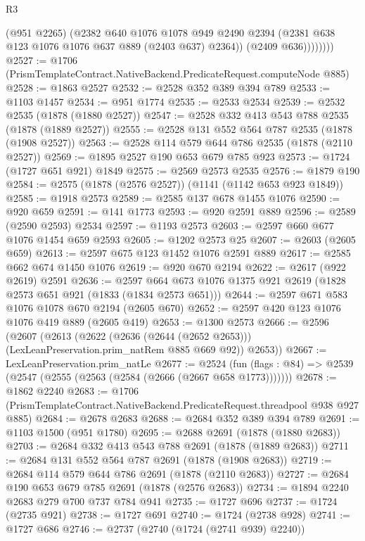 \begin{lexlean}{R3}
\begin{coremodule}
                  (@951 @2265)
                  (@2382
                    @640
                    @1076
                    @1078
                    @949
                    @2490
                    @2394
                    (@2381 @638 @123 @1076 @1076 @637 @889 (@2403 @637) @2364))
                  (@2409 @636))))))))
@2527 := @1706 (PrismTemplateContract.NativeBackend.PredicateRequest.computeNode @885)
@2528 := @1863 @2527
@2532 := @2528 @352 @389 @394 @789
@2533 := @1103 @1457
@2534 := @951 @1774
@2535 := @2533 @2534
@2539 := @2532 @2535 (@1878 (@1880 @2527))
@2547 := @2528 @332 @413 @543 @788 @2535 (@1878 (@1889 @2527))
@2555 := @2528 @131 @552 @564 @787 @2535 (@1878 (@1908 @2527))
@2563 := @2528 @114 @579 @644 @786 @2535 (@1878 (@2110 @2527))
@2569 := @1895 @2527 @190 @653 @679 @785 @923
@2573 := @1724 (@1727 @651 @921) @1849
@2575 := @2569 @2573 @2535
@2576 := @1879 @190
@2584 := @2575 (@1878 (@2576 @2527)) (@1141 (@1142 @653 @923 @1849))
@2585 := @1918 @2573
@2589 := @2585 @137 @678 @1455 @1076
@2590 := @920 @659
@2591 := @141 @1773
@2593 := @920 @2591 @889
@2596 := @2589 (@2590 @2593) @2534
@2597 := @1193 @2573
@2603 := @2597 @660 @677 @1076 @1454 @659 @2593
@2605 := @1202 @2573 @25
@2607 := @2603 (@2605 @659)
@2613 := @2597 @675 @123 @1452 @1076 @2591 @889
@2617 := @2585 @662 @674 @1450 @1076
@2619 := @920 @670 @2194
@2622 := @2617 (@922 @2619) @2591
@2636 := @2597 @664 @673 @1076 @1375 @921 @2619 (@1828 @2573 @651 @921 (@1833 (@1834 @2573 @651)))
@2644 := @2597 @671 @583 @1076 @1078 @670 @2194 (@2605 @670)
@2652 := @2597 @420 @123 @1076 @1076 @419 @889 (@2605 @419)
@2653 := @1300 @2573
@2666 := @2596
    (@2607
      (@2613
        (@2622 (@2636 (@2644 (@2652 @2653))) (LexLeanPreservation.prim_natRem @885 @669 @92))
        @2653))
@2667 := LexLeanPreservation.prim_natLe
@2677 := @2524
    (fun (flags : @84) => @2539 (@2547 (@2555 (@2563 (@2584 (@2666 (@2667 @658 @1773)))))))
@2678 := @1862 @2240
@2683 := @1706 (PrismTemplateContract.NativeBackend.PredicateRequest.threadpool @938 @927 @885)
@2684 := @2678 @2683
@2688 := @2684 @352 @389 @394 @789
@2691 := @1103 @1500 (@951 @1780)
@2695 := @2688 @2691 (@1878 (@1880 @2683))
@2703 := @2684 @332 @413 @543 @788 @2691 (@1878 (@1889 @2683))
@2711 := @2684 @131 @552 @564 @787 @2691 (@1878 (@1908 @2683))
@2719 := @2684 @114 @579 @644 @786 @2691 (@1878 (@2110 @2683))
@2727 := @2684 @190 @653 @679 @785 @2691 (@1878 (@2576 @2683))
@2734 := @1894 @2240 @2683 @279 @700 @737 @784 @941
@2735 := @1727 @696
@2737 := @1724 (@2735 @921)
@2738 := @1727 @691
@2740 := @1724 (@2738 @928)
@2741 := @1727 @686
@2746 := @2737 (@2740 (@1724 (@2741 @939) @2240))

\end{coremodule}
\end{lexlean}
